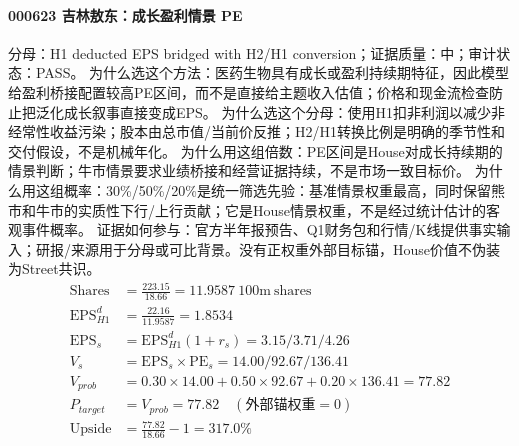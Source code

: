 \paragraph{000623 吉林敖东：成长盈利情景 PE}
分母：H1 deducted EPS bridged with H2/H1 conversion；证据质量：中；审计状态：PASS。
为什么选这个方法：医药生物具有成长或盈利持续期特征，因此模型给盈利桥接配置较高PE区间，而不是直接给主题收入估值；价格和现金流检查防止把泛化成长叙事直接变成EPS。
为什么选这个分母：使用H1扣非利润以减少非经常性收益污染；股本由总市值/当前价反推；H2/H1转换比例是明确的季节性和交付假设，不是机械年化。
为什么用这组倍数：PE区间是House对成长持续期的情景判断；牛市情景要求业绩桥接和经营证据持续，不是市场一致目标价。
为什么用这组概率：30\%/50\%/20\%是统一筛选先验：基准情景权重最高，同时保留熊市和牛市的实质性下行/上行贡献；它是House情景权重，不是经过统计估计的客观事件概率。
证据如何参与：官方半年报预告、Q1财务包和行情/K线提供事实输入；研报/来源用于分母或可比背景。没有正权重外部目标锚，House价值不伪装为Street共识。
\begin{align*}
\mathrm{Shares} &= \frac{223.15}{18.66}=11.9587\ \mathrm{100m\ shares}\\
\mathrm{EPS}_{H1}^d &= \frac{22.16}{11.9587}=1.8534\\
\mathrm{EPS}_s &= \mathrm{EPS}_{H1}^d(1+r_s)=3.15/3.71/4.26\\
V_s &= \mathrm{EPS}_s\times \mathrm{PE}_s=14.00/92.67/136.41\\
V_{prob} &= 0.30\times 14.00+0.50\times 92.67+0.20\times 136.41=77.82\\
P_{target} &= V_{prob}=77.82\quad(\text{外部锚权重}=0)\\
\mathrm{Upside} &= \frac{77.82}{18.66}-1=317.0\%\\
\end{align*}

